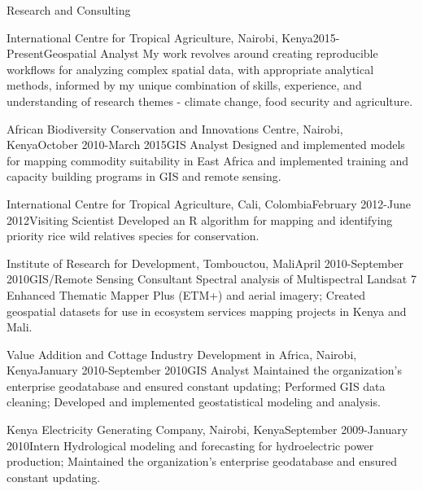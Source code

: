 \documentclass{resume} %
\begin{document}
\begin{rSection}{Research and Consulting}
\begin{pSubsection}{International Centre for Tropical Agriculture, }{Nairobi, Kenya}{2015-Present}{Geospatial Analyst}
{My work revolves around creating reproducible workflows for analyzing complex spatial data, with appropriate analytical methods, informed by my unique combination of skills, experience, and understanding of research themes - climate change, food security and agriculture.}
\end{pSubsection}

\begin{pSubsection}{African Biodiversity Conservation and Innovations Centre, }{Nairobi, Kenya}{October 2010-March 2015}{GIS Analyst}
{Designed and implemented models for mapping commodity suitability in East Africa and implemented training and capacity building programs in GIS and remote sensing.}
\end{pSubsection}


\begin{pSubsection}{International Centre for Tropical Agriculture, }{Cali, Colombia}{February 2012-June 2012}{Visiting Scientist}
{Developed an R algorithm for mapping and identifying priority rice wild relatives species for conservation.}
\end{pSubsection}

\begin{pSubsection}{Institute of Research for Development, }{Tombouctou, Mali}{April 2010-September 2010}{GIS/Remote Sensing Consultant}
{Spectral analysis of Multispectral Landsat 7 Enhanced Thematic Mapper Plus (ETM+) and aerial imagery; Created geospatial datasets for use in ecosystem services mapping projects in Kenya and Mali.}
\end{pSubsection}


\begin{pSubsection}{Value Addition and Cottage Industry Development in Africa, }{Nairobi, Kenya}{January 2010-September 2010}{GIS Analyst}
{Maintained the organization's enterprise geodatabase and ensured constant updating; Performed GIS data cleaning; Developed and implemented geostatistical modeling and analysis.}
\end{pSubsection}


\begin{pSubsection}{Kenya Electricity Generating Company, }{Nairobi, Kenya}{September 2009-January 2010}{Intern}
{Hydrological modeling and forecasting for hydroelectric power production; Maintained the organization's enterprise geodatabase and ensured constant updating.}
\end{pSubsection}



\end{rSection}
\end{document}
